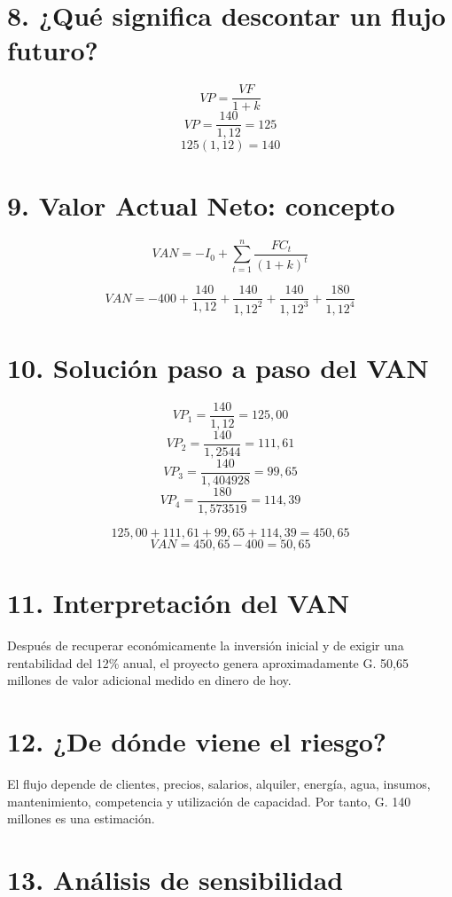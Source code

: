 \documentclass[11pt,a4paper]{article}
\begin{document}
\section*{8. ¿Qué significa descontar un flujo futuro?}

\[
VP=\frac{VF}{1+k}
\]
\[
VP=\frac{140}{1{,}12}=125
\]
\[
125(1{,}12)=140
\]

\section*{9. Valor Actual Neto: concepto}

\[
VAN=-I_0+\sum_{t=1}^{n}\frac{FC_t}{(1+k)^t}
\]

\[
VAN=-400+\frac{140}{1{,}12}+\frac{140}{1{,}12^2}+\frac{140}{1{,}12^3}+\frac{180}{1{,}12^4}
\]

\section*{10. Solución paso a paso del VAN}

\[
VP_1=\frac{140}{1{,}12}=125{,}00
\]
\[
VP_2=\frac{140}{1{,}2544}=111{,}61
\]
\[
VP_3=\frac{140}{1{,}404928}=99{,}65
\]
\[
VP_4=\frac{180}{1{,}573519}=114{,}39
\]

\[
125{,}00+111{,}61+99{,}65+114{,}39=450{,}65
\]
\[
VAN=450{,}65-400=\boxed{50{,}65}
\]

\section*{11. Interpretación del VAN}

Después de recuperar económicamente la inversión inicial y de exigir una rentabilidad del 12\% anual, el proyecto genera aproximadamente G. 50,65 millones de valor adicional medido en dinero de hoy.

\section*{12. ¿De dónde viene el riesgo?}

El flujo depende de clientes, precios, salarios, alquiler, energía, agua, insumos, mantenimiento, competencia y utilización de capacidad. Por tanto, G. 140 millones es una estimación.

\section*{13. Análisis de sensibilidad}
\end{document}
